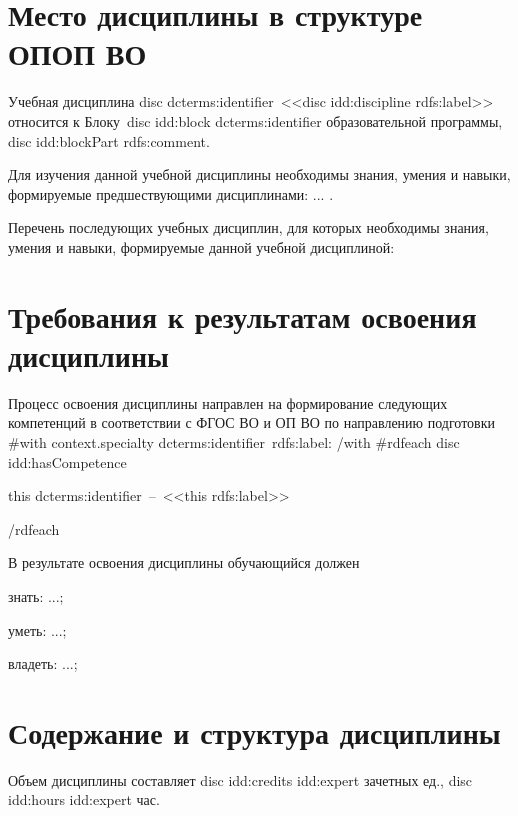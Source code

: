 \documentclass[12pt]{scrartcl}
\newcommand{\rdf}[2]{#2}
\newenvironment{rdfctx}[1]{}{}
\begin{document}
\section{Место дисциплины в структуре ОПОП ВО}
Учебная дисциплина {{disc dcterms:identifier}}~<<{{disc idd:discipline rdfs:label}}>> относится к
Блоку~{{disc idd:block dcterms:identifier}} образовательной программы, {{disc idd:blockPart rdfs:comment}}.

\begin{rdfctx}{\rdfsetctx{dc}{syll wpdd:courseDC !wpdd:CourseDC}}
Для изучения данной учебной дисциплины необходимы знания, умения и навыки,
формируемые предшествующими дисциплинами: \rdf{dc wpdd:require !cnt:ContentAsText}{... .}

Перечень последующих учебных дисциплин, для которых необходимы знания, умения и
навыки, формируемые данной учебной дисциплиной: \rdf{dc wpdd:ensure !cnt:ContentAsText}
\end{rdfctx}


\section{Требования к результатам освоения дисциплины}

Процесс освоения дисциплины направлен на формирование следующих компетенций в
соответствии с ФГОС ВО и ОП ВО по направлению подготовки {{#with context.specialty}}
{{dcterms:identifier}}~{{rdfs:label}}: {{/with}}
{{#rdfeach disc idd:hasCompetence}}

{{this dcterms:identifier}}\ --\ <<{{this rdfs:label}}>>

{{/rdfeach}}

\begin{rdfctx}{\rdfsetctx{dc}{syll wpdd:courseDC !wpdd:CourseDC}}
В результате освоения дисциплины обучающийся должен

знать: \rdf{dc wpdd:know !cnt:ContentAsText}{...};

уметь: \rdf{dc wpdd:ableTo !cnt:ContentAsText}{...};

владеть: \rdf{dc wpdd:posess !cnt:ContentAsText}{...};
\end{rdfctx}

\section{Содержание и структура дисциплины}

Объем дисциплины составляет {{disc idd:credits idd:expert}} зачетных ед., {{disc idd:hours idd:expert}} час.
\end{document}
